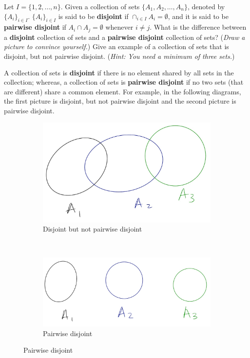 \documentclass{article}
\theoremstyle{definition}
\begin{document}
\begin{question}
   Let $I=\{1, 2, \dots, n\}$. Given a collection of sets $\{A_1,A_2,\dots, A_n\}$, denoted by $\{A_i\}_{i\in I}$. $\{A_i\}_{i\in I}$ is said to be \textbf{disjoint} if $\cap_{i\in I}A_i=\emptyset$, and it is said to be \textbf{pairwise disjoint} if $A_i\cap A_j=\emptyset$ whenever $i\neq j$. What is the difference between a \textbf{disjoint} collection of sets and a \textbf{pairwise disjoint} collection of sets? (\textit{Draw a picture to convince yourself.}) Give an example of a collection of sets that is disjoint, but not pairwise disjoint. (\textit{Hint: You need a minimum of three sets.})
\end{question}
\begin{solution}
A collection of sets is \textbf{disjoint} if there is no element shared by all sets in the collection; whereas, a collection of sets is \textbf{pairwise disjoint} if no two sets (that are different) share a common element. For example, in the following diagrams, the first picture is disjoint, but not pairwise disjoint and the second picture is pairwise disjoint.
\begin{figure}[h]
\centering
	\begin{subfigure}[h]{.35\textwidth}
	\includegraphics[width=\textwidth]{ProblemSets/fig/disjoint.jpg}
	\caption{Disjoint but not pairwise disjoint}
	\end{subfigure}
	~\quad\hspace{1cm}
	\begin{subfigure}[h]{.35\textwidth}
	\includegraphics[width=\textwidth]{ProblemSets/fig/pair-disjoint.jpg}
	\caption{Pairwise disjoint}
	\end{subfigure}	
\end{figure}



\end{solution}
\end{document}
